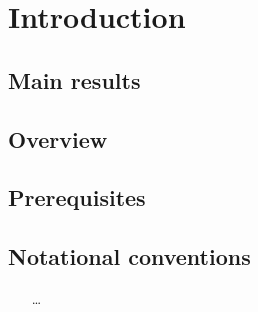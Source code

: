 \chapter{Introduction}

\section{Main results}

\section{Overview}

\section{Prerequisites}

\section{Notational conventions}

{\color{blue}
\begin{itemize}
	\item [\dots]  %
\end{itemize}
}